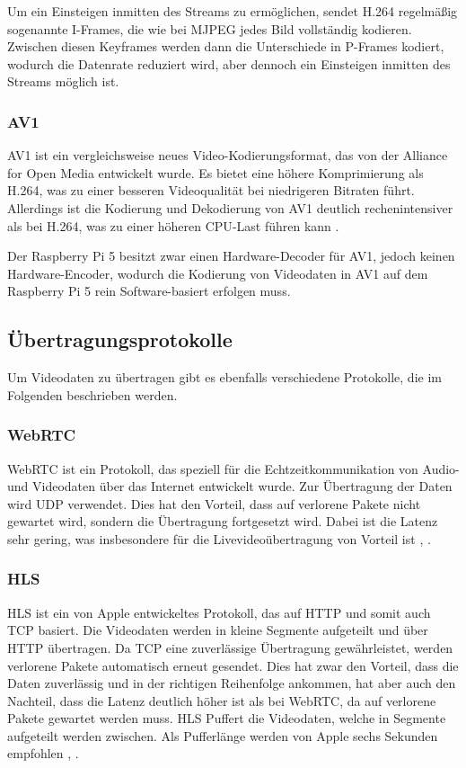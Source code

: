         Um ein Einsteigen inmitten des Streams zu ermöglichen, sendet H.264 regelmäßig sogenannte I-Frames, die wie bei \ac{MJPEG} jedes Bild vollständig kodieren. Zwischen diesen Keyframes werden dann die Unterschiede in P-Frames kodiert, wodurch die Datenrate reduziert wird, aber dennoch ein Einsteigen inmitten des Streams möglich ist.

        \subsubsection{\acl{AV1}}
        \ac{AV1} ist ein vergleichsweise neues Video-Kodierungsformat, das von der Alliance for Open Media entwickelt wurde. Es bietet eine höhere Komprimierung als H.264, was zu einer besseren Videoqualität bei niedrigeren Bitraten führt. Allerdings ist die Kodierung und Dekodierung von \ac{AV1} deutlich rechenintensiver als bei H.264, was zu einer höheren \ac{CPU}-Last führen kann \cite{PerformanceAnalysisH264}. 

        Der Raspberry Pi 5 besitzt zwar einen Hardware-Decoder für \ac{AV1}, jedoch keinen Hardware-Encoder, wodurch die Kodierung von Videodaten in \ac{AV1} auf dem Raspberry Pi 5 rein Software-basiert erfolgen muss.

    \subsection{Übertragungsprotokolle}
    Um Videodaten zu übertragen gibt es ebenfalls verschiedene Protokolle, die im Folgenden beschrieben werden.

        \subsubsection{\acl{WebRTC}}
        \ac{WebRTC} ist ein Protokoll, das speziell für die Echtzeitkommunikation von Audio- und Videodaten über das Internet entwickelt wurde. Zur Übertragung der Daten wird \ac{UDP} verwendet. Dies hat den Vorteil, dass auf verlorene Pakete nicht gewartet wird, sondern die Übertragung fortgesetzt wird. Dabei ist die Latenz sehr gering, was insbesondere für die Livevideoübertragung von Vorteil ist \cite[Kapitel~1 und Kapitel~2]{RealTimeCommunicationWebRTC}, \cite{JavaScriptSessionEstablishment}.

        \subsubsection{\acl{HLS}}
        \ac{HLS} ist ein von Apple entwickeltes Protokoll, das auf \ac{HTTP} und somit auch \ac{TCP} basiert. Die Videodaten werden in kleine Segmente aufgeteilt und über \ac{HTTP} übertragen. Da \ac{TCP} eine zuverlässige Übertragung gewährleistet, werden verlorene Pakete automatisch erneut gesendet. Dies hat zwar den Vorteil, dass die Daten zuverlässig und in der richtigen Reihenfolge ankommen, hat aber auch den Nachteil, dass die Latenz deutlich höher ist als bei \ac{WebRTC}, da auf verlorene Pakete gewartet werden muss. \ac{HLS} Puffert die Videodaten, welche in Segmente aufgeteilt werden zwischen. Als Pufferlänge werden von Apple sechs Sekunden empfohlen \cite[Abschnitt~7.5]{HTTPLiveStreaminga}, \cite{HTTPLiveStreaming}. 

